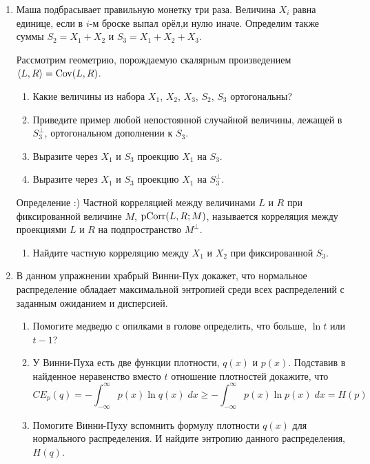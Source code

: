 \begin{enumerate}
\item Маша подбрасывает правильную монетку три раза. Величина $X_i$ равна единице,
если в $i$-м броске выпал орёл,и нулю иначе. Определим также суммы $S_2 = X_1 + X_2$
и $S_3 = X_1 + X_2 + X_3$.

Рассмотрим геометрию, порождаемую скалярным произведением $\langle L, R\rangle = \operatorname{Cov}(L, R)$.



\begin{enumerate}
  \item Какие величины из набора $X_1$, $X_2$, $X_3$, $S_2$, $S_3$ ортогональны?
  \item Приведите пример любой непостоянной случайной величины, лежащей в $S_3^{\perp}$, ортогональном дополнении к $S_3$.
  \item Выразите через $X_1$ и $S_3$ проекцию $X_1$ на $S_3$.
  \item Выразите через $X_1$ и $S_3$ проекцию $X_1$ на $S_3^{\perp}$.
\end{enumerate}

Определение :) Частной корреляцией между величинами $L$ и $R$ при фиксированной величине $M$,
$\operatorname{pCorr}(L, R; M)$, называется корреляция между проекциями $L$ и $R$ на подпространство $M^{\perp}$.

\begin{enumerate}[resume]
  \item Найдите частную корреляцию между $X_1$ и $X_2$ при фиксированной $S_3$.
\end{enumerate}

\item В данном упражнении храбрый Винни-Пух докажет, что нормальное распределение
обладает максимальной энтропией среди всех распределений с заданным ожиданием и дисперсией.

\begin{enumerate}
  \item Помогите медведю с опилками в голове определить, что больше, $\ln t$ или $t-1$?
  \item У Винни-Пуха есть две функции плотности, $q(x)$ и $p(x)$.
  Подставив в найденное неравенство вместо $t$ отношение плотностей докажите, что
\[
 CE_p(q) = - \int_{-\infty}^{\infty} p(x) \ln q(x) \; dx \geq  - \int_{-\infty}^{\infty} p(x) \ln p(x) \; dx = H(p)
\]
\item Помогите Винни-Пуху вспомнить формулу плотности $q(x)$ для нормального распределения.
И найдите энтропию данного распределения, $H(q)$.


\end{enumerate}
\end{enumerate}
